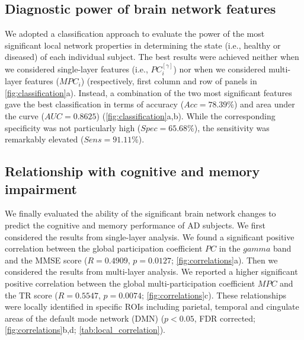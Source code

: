 \subsection{Diagnostic power of brain network features}

We adopted a classification approach to evaluate the power of the most significant local network properties in determining the state (i.e., healthy or diseased) of each individual subject.
The best results were achieved neither when we considered single-layer features (i.e., $PC^{[\gamma]}_i$) nor when we considered multi-layer features ($MPC_i$) (respectively, first column and row of panels in \autoref{fig:classification}a). Instead, a combination of the two most significant features gave the best classification in terms of accuracy ($Acc=78.39\%$) and area under the curve ($AUC=0.8625$)  (\autoref{fig:classification}a,b).
While the corresponding specificity was not particularly high ($Spec=65.68\%$), the sensitivity was remarkably elevated ($Sens=91.11\%$).




\subsection{Relationship with cognitive and memory impairment}

We finally evaluated the ability of the significant brain network changes to predict the cognitive and memory performance of AD subjects.
We first considered the results from single-layer analysis. We found a significant positive correlation between the global participation coefficient $PC$ in the $gamma$ band and the MMSE score ($R=0.4909$, $p=0.0127$; \autoref{fig:correlations}a).
Then we considered the results from multi-layer analysis. We reported a higher significant positive correlation between the global multi-participation coefficient $MPC$ and the TR score ($R = 0.5547$, $p = 0.0074$; \autoref{fig:correlations}c).
These relationships were locally identified in specific ROIs including parietal, temporal and cingulate areas of the default mode network (DMN) \citep{buckner_brains_2008} ($p < 0.05$, FDR corrected; \autoref{fig:correlations}b,d; \autoref{tab:local_correlation}).
